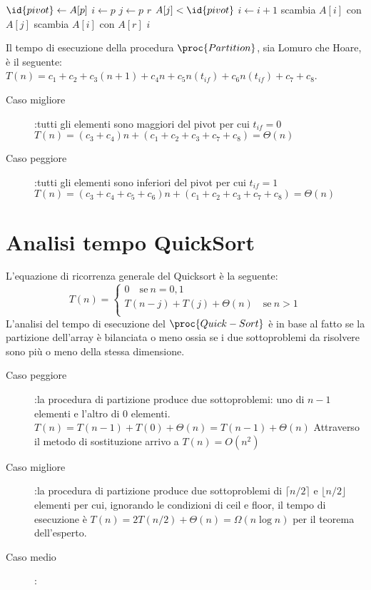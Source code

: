 \begin{codebox}
\li $\id{pivot} \gets A[p]$
\li $i \gets p$
\li \For $j \gets p$ \To $r$
    \Do
\li               \If $A[j] < \id{pivot}$
                  \Then
\li                              $i \gets i + 1$
\li                              scambia $A[i]$ con $A[j]$
                  \End
    \End
\li scambia $A[i]$ con $A[r]$
\li \Return $i$
\end{codebox}


Il tempo di esecuzione della procedura $\proc{Partition}$, sia Lomuro che Hoare, è il seguente:
$T(n) = c_1 + c_2 + c_3(n+1) + c_4n + c_5n(t_{if}) + c_6n(t_{if}) + c_7 + c_8$.

\begin{description}
  \item[Caso migliore]:tutti gli elementi sono maggiori del pivot per cui $t_{if} = 0$
        $T(n) = (c_3 + c_4)n + (c_1+c_2+c_3+c_7+c_8) = \Theta(n)$
  \item[Caso peggiore]:tutti gli elementi sono inferiori del pivot per cui $t_{if} = 1$
        $T(n) = (c_3+c_4+c_5+c_6)n + (c_1+c_2+c_3+c_7+c_8) = \Theta(n)$
\end{description}

\section{Analisi tempo QuickSort}
L'equazione di ricorrenza generale del Quicksort è la seguente:
\begin{equation*}
    T(n) = \begin{cases} 0 \quad \text{se} \ n = 0,1 \\
                         T(n-j) + T(j) + \Theta(n) \quad \text{se} \ n > 1 \\
           \end{cases}
\end{equation*}
L'analisi del tempo di esecuzione del $\proc{Quick-Sort}$ è in base al fatto se
la partizione dell'array è bilanciata o meno ossia se i due sottoproblemi da risolvere
sono più o meno della stessa dimensione.
\begin{description}
  \item[Caso peggiore]:la procedura di partizione produce due sottoproblemi:
        uno di $n-1$ elementi e l'altro di $0$ elementi.
        $T(n) = T(n-1) + T(0) + \Theta(n)
              = T(n-1) + \Theta(n)$
        Attraverso il metodo di sostituzione arrivo a $T(n) = O(n^2)$
  \item[Caso migliore]:la procedura di partizione produce due sottoproblemi di $\lceil n/2 \rceil$
        e $\lfloor n/2 \rfloor$ elementi per cui, ignorando le condizioni di ceil e floor,
        il tempo di esecuzione è $T(n) = 2T(n/2) + \Theta(n) = \Omega(n \log n)$ per il teorema dell'esperto.
  \item[Caso medio]:
\end{description}


